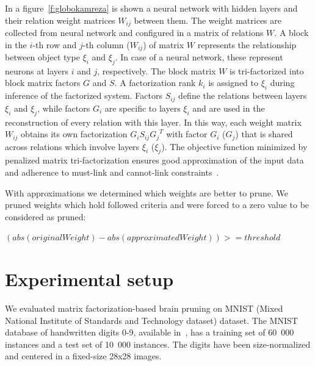 \documentclass{article} %
\begin{document}
In a figure~\ref{f:globokamreza} is shown a neural network with hidden
layers and their relation weight matrices $W_{ij}$ between them. The weight
matrices are collected from neural network and configured in a matrix of
relations $W$. A block in the $i$-th
row and $j$-th column ($W_{ij}$) of matrix $W$ represents the relationship
between object type $\xi_i$ and $\xi_j$. In case of a neural network, these
represent neurons at layers $i$ and $j$, respectively. The block matrix $W$ is
tri-factorized into block matrix factors $G$ and $S$. A factorization rank
$k_i$ is assigned to $\xi_i$ during inference of the factorized system. Factors
$S_{ij}$ define the relations between layers $\xi_i$ and $\xi_j$, while
factors $G_i$ are specific to layers $\xi_i$ and are used in the
reconstruction of every relation with this layer. In this way, each
weight matrix $W_{ij}$ obtains its own factorization $G_i S_{ij} {G_j}^T$ with
factor $G_i$ ($G_j$) that is shared across relations which involve layers
$\xi_i$ ($\xi_j$). The objective function minimized by penalized matrix
tri-factorization ensures good approximation of the input data and adherence to
must-link and cannot-link constraints~\cite{zitnik2015data}.


With approximations we determined which weights are better to prune. We pruned
weights which hold followed criteria and were forced to a zero value to be
considered as pruned:

$(abs(originalWeight) - abs(approximatedWeight)) >= threshold$




\section{Experimental setup}

We evaluated matrix factorization-based brain pruning on MNIST (Mixed National
Institute of Standards and Technology dataset) dataset. The MNIST database of
handwritten digits 0-9, available in~\cite{lecun-mnisthandwrittendigit-2010},
has a training set of 60~000 instances and a test set of 10~000 instances. The
digits have been size-normalized and centered in a fixed-size 28x28 images.
\end{document}
